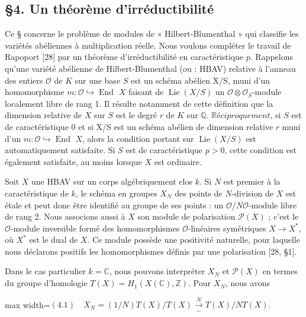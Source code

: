 \documentclass[11pt]{article}
\newcommand{\DFormula}[1]{\par\smallskip\noindent\begin{adjustbox}{max width=\linewidth}$\displaystyle #1$\end{adjustbox}\par\smallskip}
\begin{document}
\subsection*{§4. Un théorème d’irréductibilité}
\par
Ce § concerne le problème de modules de « Hilbert-Blumenthal » qui classifie les variétés abéliennes à multiplication réelle. Nous voulons compléter le travail de Rapoport [28] par un théorème d’irréductibilité en caractéristique \(p\). Rappelons qu’une variété abélienne de Hilbert-Blumenthal (ou : HBAV) relative à l’anneau des entiers \(\mathcal{O}\) de \(K\) sur une base \(S\) est un schéma abélien X/S, muni d’un homomorphisme \(m:\mathcal{O}\hookrightarrow \operatorname{End}\) \(X\) faisant de \(\operatorname{Lie}(X/S)\) un \(\mathcal{O}\otimes \mathcal{O}_{S}\)-module localement libre de rang 1. Il résulte notamment de cette définition que la dimension relative de \(X\) sur \(S\) est le degré \(r\) de \(K\) sur \(\mathbb{Q}\). \(\mathbb{R}\text{é}ciproquement\), si \(S\) est de caractéristique 0 et si X/S est un schéma abélien de dimension relative \(r\) muni d’un \(m:\mathcal{O}\hookrightarrow \operatorname{End}\) \(X\), alors la condition portant sur \(\operatorname{Lie}(X/S)\) est automatiquement satisfaite. Si \(S\) est de caractéristique \(p>0\), cette condition est également satisfaite, au moins lorsque \(X\) est ordinaire.\par
\par
Soit \(X\) une HBAV sur un corps algébriquement clos \(k\). Si \(N\) est premier à la caractéristique de \(k\), le schéma en groupes \(X_{N}\) des points de \(N\)-division de \(X\) est étale et peut donc être identifié au groupe de ses points : un \(\mathcal{O}/N\mathcal{O}\)-module libre de rang 2. Nous associons aussi à \(X\) son module de polarisation \(\mathcal{P}(X)\) ; c’est le \(\mathcal{O}\)-module inversible formé des homomorphismes \(\mathcal{O}\)-linéaires symétriques \(X\to X^{\ast}\), où \(X^{\ast}\) est le dual de \(X\). Ce module possède une positivité naturelle, pour laquelle nous déclarons positifs les homomorphismes définis par une polarisation [28, §1].\par
\par
Dans le cas particulier \(k=\mathbb{C}\), nous pouvons interpréter \(X_{N}\) et \(\mathcal{P}(X)\) en termes du groupe d’homologie \(T(X)=H_{1}(X(\mathbb{C}),\mathbb{Z})\). Pour \(X_{N}\), nous avons\par
\par
\DFormula{(4.1)\quad X_N=(1/N)T(X)/T(X)\xrightarrow[\sim]{N}T(X)/NT(X).}
\end{document}
